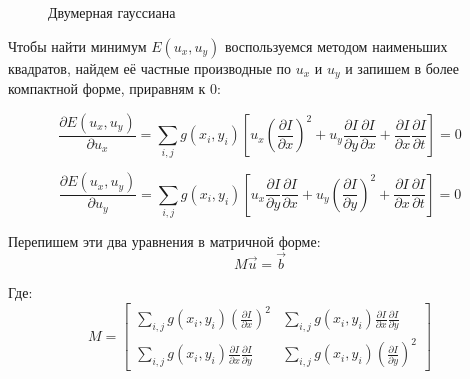 \begin{figure}[!htb]
\caption{Двумерная гауссиана}
\label{pic:Gaussian2d}
\end{figure}

Чтобы найти минимум  $E(u_x, u_y)$ воспользуемся методом наименьших квадратов, найдем её частные производные по $u_x$ и $u_y$ и запишем в более компактной форме, приравням к 0:

$$
\frac{\partial E(u_x, u_y) }{\partial u_x} = 
\sum \limits_{i,j} g(x_i, y_i) 
\left[
u_x \left( \frac{\partial I}{\partial x} \right)^2 +
	u_y \frac{\partial I}{\partial y}\frac{\partial I}{\partial x} +
	\frac{\partial I}{\partial x}\frac{\partial I}{\partial t}
\right] = 0
$$

$$
\frac{\partial E(u_x, u_y) }{\partial u_y} = 
\sum \limits_{i,j} g(x_i, y_i) 
\left[
	u_x \frac{\partial I}{\partial y}\frac{\partial I}{\partial x} +
	u_y \left( \frac{\partial I}{\partial y} \right)^2 +
	\frac{\partial I}{\partial x}\frac{\partial I}{\partial t}
\right] = 0
$$

Перепишем эти два уравнения в матричной форме:
$$ M \vec{u} = \vec{b}$$

Где: 
$$ M = 
\left[ 	
\begin{array}{cc}
	\sum \limits_{i,j} g(x_i, y_i) 
		\left( \frac{\partial I}{\partial x} \right)^2 
	& \sum \limits_{i,j} g(x_i, y_i) 
			\frac{\partial I}{\partial x} 										\frac{\partial I}{\partial y} 
	\\ 
	\sum \limits_{i,j} g(x_i, y_i) 
			\frac{\partial I}{\partial x} 										\frac{\partial I}{\partial y} 
	& \sum \limits_{i,j} g(x_i, y_i)
		\left( \frac{\partial I}{\partial y} \right)^2 
\end{array} 
\right]
$$

